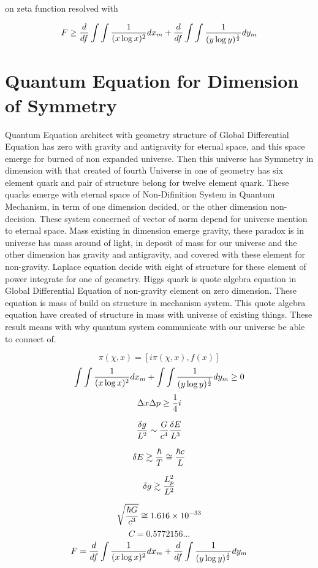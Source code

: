 \documentclass{jsarticle}
\begin{document}
  on zeta function resolved with

  $$ F \ge {d \over df} \int \int {1 \over (x \log x)^2}dx_{m} + {d \over df} \int \int {1 \over (y \log y)^{1 \over 2}
  }dy_{m} $$


\section{Quantum Equation for Dimension of Symmetry}

  Quantum Equation architect with geometry structure of Global Differential Equation has zero with gravity and
antigravity for eternal space, and this space emerge for burned of non expanded universe. Then this universe has
Symmetry in dimension with that created of fourth Universe in one of geometry has six element quark and pair of 
structure belong for twelve element quark. These quarks emerge with eternal space of Non-Difinition System in Quantum
Mechanism, in term of one dimension decided, or the other dimension non-decision. These system concerned of vector of
norm depend for universe mention to eternal space. Mass existing in dimension emerge gravity, these paradox is
in universe has mass around of light, in deposit of mass for our universe and the other dimension has gravity
and antigravity, and covered with these element for non-gravity. Laplace equation decide with eight of structure
for these element of power integrate for one of geometry. Higgs quark is quote algebra equation in Global Differential
Equation of non-gravity element on zero dimension. These equation is mass of build on structure in mechanism system.
This quote algebra equation have created of structure in mass with universe of existing things.
These result means with why quantum system communicate with our universe be able to connect of.

  $$ \pi (\chi,x) = [i \pi (\chi,x),f(x)] $$
  $$ \int \int {1 \over (x \log x)^2}dx_{m} + \int \int {1 \over (y \log y)^{1 \over 2}}dy_{m} \ge 0 $$
  $$ \Delta x \Delta p \ge {1 \over 4}i $$

  $$ {\delta g \over L^2} \sim {G \over c^4}{\delta E \over L^3}  $$

  $$ \delta E \gtrsim {\hbar \over T} \cong {\hbar c \over L} $$

  $$ \delta g \gtrsim {L^2_{p} \over L^2} $$

  $$ \sqrt{\hbar G \over c^3} \cong 1.616 \times 10^{-33} $$
  $$ C = 0.5772156 \dots $$
  $$ F = {d \over df} \int {1 \over (x \log x)^2}dx_{m} + {d \over df} \int {1 \over (y \log y)^{1 \over 2}}dy_{m} $$
\end{document}
